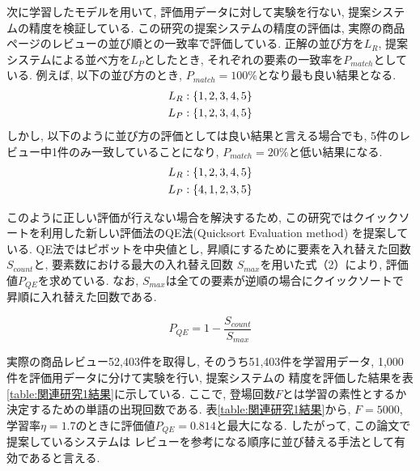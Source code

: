 \documentclass{ltjarticle}
\begin{document}
次に学習したモデルを用いて, 評価用データに対して実験を行ない, 提案システムの精度を検証している. 
この研究の提案システムの精度の評価は, 実際の商品ページのレビューの並び順との一致率で評価している. 
正解の並び方を$L_R$, 提案システムによる並べ方を$L_P$としたとき, それぞれの要素の一致率を$P_{match}$としている. 
例えば, 以下の並び方のとき, $P_{match}=100\%$となり最も良い結果となる. 
\begin{align}
    L_R:\{1,2,3,4,5\}\notag\\
    L_P:\{1,2,3,4,5\}\notag
\end{align}
しかし, 以下のように並び方の評価としては良い結果と言える場合でも, 5件のレビュー中1件のみ一致していることになり, 
$P_{match}=20\%$と低い結果になる. 
\begin{align}
    L_R:\{1,2,3,4,5\}\notag\\
    L_P:\{4,1,2,3,5\}\notag
\end{align}

このように正しい評価が行えない場合を解決するため, この研究ではクイックソートを利用した新しい評価法のQE法(Quicksort Evaluation method)
を提案している. QE法ではピボットを中央値とし, 昇順にするために要素を入れ替えた回数$S_{count}$と, 要素数における最大の入れ替え回数
$S_{max}$を用いた式（2）により, 評価値$P_{QE}$を求めている. なお, $S_{max}$は全ての要素が逆順の場合にクイックソートで
昇順に入れ替えた回数である. 
\vspace{5truept}

\begin{equation}
    P_{QE}=1-\dfrac{S_{count}}{S_{max}}
\end{equation}
\vspace{5truept}

実際の商品レビュー52,403件を取得し, そのうち51,403件を学習用データ, 1,000件を評価用データに分けて実験を行い, 提案システムの
精度を評価した結果を表\ref{table:関連研究1結果}に示している. 
ここで, 登場回数$F$とは学習の素性とするか決定するための単語の出現回数である. 
表\ref{table:関連研究1結果}から, $F=5000$, 学習率$\eta=1.7$のときに評価値$P_{QE}=0.814$と最大になる. したがって, この論文で提案しているシステムは
レビューを参考になる順序に並び替える手法として有効であると言える. 
\end{document}

